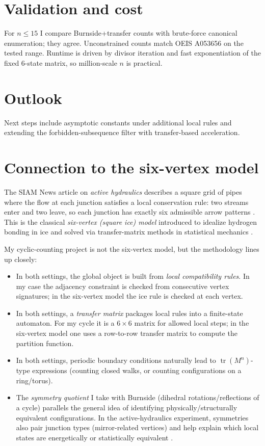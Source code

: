 \documentclass[12pt]{article}
\theoremstyle{definition}
\begin{document}
\section{Validation and cost}
For \(n\le15\) I compare Burnside+transfer counts with brute-force canonical enumeration; they agree. Unconstrained counts match OEIS A053656 on the tested range. Runtime is driven by divisor iteration and fast exponentiation of the fixed 6-state matrix, so million-scale \(n\) is practical.

\section{Outlook}
Next steps include asymptotic constants under additional local rules and extending the forbidden-subsequence filter with transfer-based acceleration.

\section{Connection to the six-vertex model}
The SIAM News article on \emph{active hydraulics} describes a square grid of pipes where the flow at each junction satisfies a local conservation rule: two streams enter and two leave, so each junction has exactly six admissible arrow patterns \cite{FrancisSIAM2025,JorgeBartoloPRL2025}. This is the classical \emph{six-vertex (square ice) model} introduced to idealize hydrogen bonding in ice \cite{PaulingJACS1935} and solved via transfer-matrix methods in statistical mechanics \cite{LiebPhysRev1967,SutherlandPRL1967,BaxterBook1982}.

My cyclic-counting project is not the six-vertex model, but the methodology lines up closely:
\begin{itemize}
    \item In both settings, the global object is built from \emph{local compatibility rules}. In my case the adjacency constraint is checked from consecutive vertex signatures; in the six-vertex model the ice rule is checked at each vertex.
    \item In both settings, a \emph{transfer matrix} packages local rules into a finite-state automaton. For my cycle it is a \(6\times 6\) matrix for allowed local steps; in the six-vertex model one uses a row-to-row transfer matrix to compute the partition function.
    \item In both settings, periodic boundary conditions naturally lead to \(\operatorname{tr}(M^n)\)-type expressions (counting closed walks, or counting configurations on a ring/torus).
    \item The \emph{symmetry quotient} I take with Burnside (dihedral rotations/reflections of a cycle) parallels the general idea of identifying physically/structurally equivalent configurations. In the active-hydraulics experiment, symmetries also pair junction types (mirror-related vertices) and help explain which local states are energetically or statistically equivalent \cite{FrancisSIAM2025}.
\end{itemize}
\end{document}

